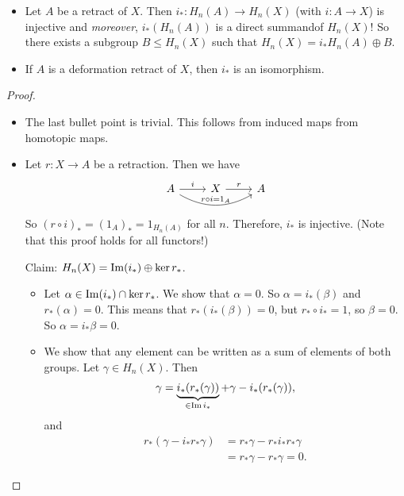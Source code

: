 \begin{prop}[1.12]
    \begin{itemize}
        \item Let $A$ be a retract of $X$.
            Then $i_*: H_n(A) \to  H_n(X)$ (with $i: A \to  X$) is injective and \emph{moreover}, $i_*(H_n(A))$ is a direct summandof $H_n(X)$!
            So there exists a subgroup $B \le  H_n(X)$ such that $H_n(X) = i_* H_n(A) \oplus B$.
        \item If $A$ is a deformation retract of $X$, then $i_*$ is an isomorphism.
    \end{itemize}
\end{prop}
\begin{proof}
    \begin{itemize}
        \item The last bullet point is trivial.
            This follows from induced maps from homotopic maps.
        \item Let $r: X \to  A$ be a retraction. 
            Then we have
            \[
                \begin{tikzcd}
                    A \arrow[r, "i"] \arrow[rr, bend right, "r  \circ  i = 1_A"]& X \arrow[r, "r"] & A
                \end{tikzcd}
            \]
            So  $(r  \circ  i)_* = (1_A)_* = 1_{H_n(A)}$ for all $n$.
            Therefore, $i_*$ is injective. (Note that this proof holds for all functors!)

            Claim: $H_n(X) = \operatorname{Im}(i_*) \oplus \operatorname{ker} r_*$.
            \begin{itemize}
                \item 
                    Let  $\alpha \in  \operatorname{Im}(i_*) \cap  \operatorname{ker} r_*$.
                    We show that $\alpha = 0$.
                    So  $\alpha = i_* (\beta)$ and  $r_*(\alpha) = 0$.
                    This means that  $r_*(i_*(\beta)) = 0$, but $r_*  \circ i_* = 1$, so $\beta  = 0$.
                    So $\alpha = i_* \beta = 0$.
                \item 
                    We show that any element can be written as a sum of elements of both groups.
                    Let $\gamma \in H_n(X)$.
                    Then
                    \[
                        \gamma = \underbrace{i_* (r _* (\gamma))}_{ \in  \operatorname{Im} i_*} + \gamma - i_* (r _* (\gamma))
                    ,\] 
                    and
                    \begin{align*}
                        r_*( \gamma - i_* r_* \gamma) &= r_* \gamma - r_* i_* r_*\gamma\\
                                                      &= r_* \gamma - r_* \gamma = 0
                    .\end{align*}
            \end{itemize}
    \end{itemize}
\end{proof}
